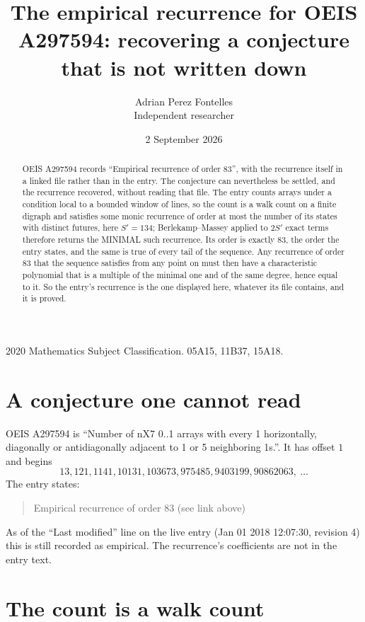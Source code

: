 \documentclass[11pt,a4paper]{article}
\title{The empirical recurrence for OEIS A297594: recovering a conjecture that is not written down}
\author{Adrian Perez Fontelles\\ \small Independent researcher}
\date{2 September 2026}
\theoremstyle{plain}
\theoremstyle{definition}
\begin{document}
\maketitle

\begin{abstract}
OEIS A297594 records ``Empirical recurrence of order $83$'', with the recurrence itself in a
linked file rather than in the entry. The conjecture can nevertheless be settled, and the
recurrence recovered, without reading that file. The entry counts arrays under a condition
local to a bounded window of lines, so the count is a walk count on a finite digraph and
satisfies some monic recurrence of order at most the number of its states with distinct
futures, here $S'=134$; Berlekamp--Massey applied to $2S'$ exact
terms therefore returns the MINIMAL such recurrence. Its order is exactly $83$, the order
the entry states, and the same is true of every tail of the sequence. Any recurrence of order
$83$ that the sequence satisfies from any point on must then have a characteristic
polynomial that is a multiple of the minimal one and of the same degree, hence equal to it. So
the entry's recurrence is the one displayed here, whatever its file contains, and it is
proved.
\end{abstract}

\noindent\small 2020 Mathematics Subject Classification. 05A15, 11B37, 15A18.\normalsize

\section{A conjecture one cannot read}

OEIS A297594 is ``Number of nX7 0..1 arrays with every 1 horizontally, diagonally or antidiagonally adjacent to 1 or 5 neighboring 1s.''. It has offset $1$ and begins
\[
13, 121, 1141, 10131, 103673, 975485, 9403199, 90862063,\ \dots
\]
The entry states:
\begin{quote}
Empirical recurrence of order 83 (see link above)
\end{quote}
As of the ``Last modified'' line on the live entry (Jan 01 2018 12:07:30, revision 4) this is still
recorded as empirical. The recurrence's coefficients are not in the entry text.

\section{The count is a walk count}
\end{document}
